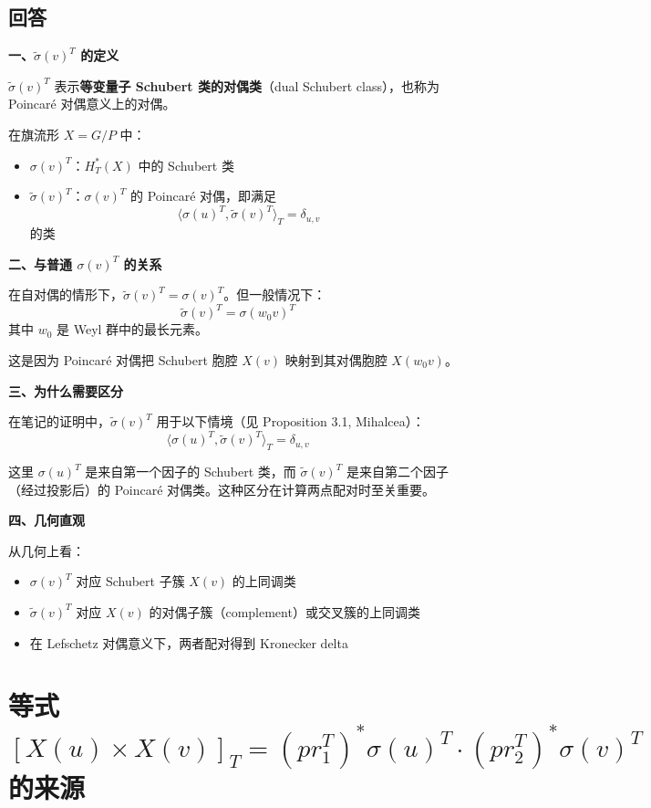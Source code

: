 \subsection{回答}
\textbf{一、$\widetilde{\sigma}(v)^T$ 的定义}

$\widetilde{\sigma}(v)^T$ 表示\textbf{等变量子 Schubert 类的对偶类}（dual Schubert class），也称为 Poincaré 对偶意义上的对偶。

在旗流形 $X = G/P$ 中：
\begin{itemize}
\item $\sigma(v)^T$：$H_T^*(X)$ 中的 Schubert 类
\item $\widetilde{\sigma}(v)^T$：$\sigma(v)^T$ 的 Poincaré 对偶，即满足
$$\langle \sigma(u)^T, \widetilde{\sigma}(v)^T \rangle_T = \delta_{u,v}$$
的类
\end{itemize}

\textbf{二、与普通 $\sigma(v)^T$ 的关系}

在自对偶的情形下，$\widetilde{\sigma}(v)^T = \sigma(v)^T$。但一般情况下：
$$\widetilde{\sigma}(v)^T = \sigma(w_0 v)^T$$
其中 $w_0$ 是 Weyl 群中的最长元素。

这是因为 Poincaré 对偶把 Schubert 胞腔 $X(v)$ 映射到其对偶胞腔 $X(w_0 v)$。

\textbf{三、为什么需要区分}

在笔记的证明中，$\widetilde{\sigma}(v)^T$ 用于以下情境（见 Proposition 3.1, Mihalcea）：
$$\langle \sigma(u)^T, \widetilde{\sigma}(v)^T \rangle_T = \delta_{u,v}$$

这里 $\sigma(u)^T$ 是来自第一个因子的 Schubert 类，而 $\widetilde{\sigma}(v)^T$ 是来自第二个因子（经过投影后）的 Poincaré 对偶类。这种区分在计算两点配对时至关重要。

\textbf{四、几何直观}

从几何上看：
\begin{itemize}
\item $\sigma(v)^T$ 对应 Schubert 子簇 $X(v)$ 的上同调类
\item $\widetilde{\sigma}(v)^T$ 对应 $X(v)$ 的对偶子簇（complement）或交叉簇的上同调类
\item 在 Lefschetz 对偶意义下，两者配对得到 Kronecker delta
\end{itemize}

\section{等式 $[X(u) \times X(v)]_T = (pr_1^T)^* \sigma(u)^T \cdot (pr_2^T)^* \sigma(v)^T$ 的来源}\label{sec:qa-product-class-pullback}
